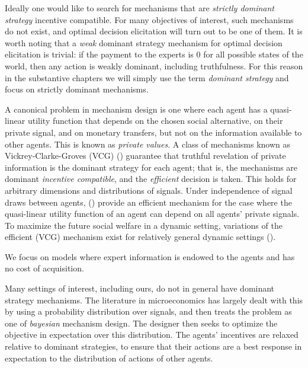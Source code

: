 Ideally one would like to search for mechanisms that are \emph{strictly dominant strategy} incentive compatible. %
For many objectives of interest, such mechanisms do not exist, and optimal decision elicitation will turn out to be one of them.
It is worth noting that a \emph{weak} dominant strategy mechanism for optimal decision elicitation is trivial: if the payment to the experts is 0 for all possible states of the world, then any action is weakly dominant, including truthfulness. 
For this reason in the substantive chapters we will simply use the term \emph{dominant strategy} and focus on strictly dominant mechanisms. 

A canonical problem in mechanism design is one where each agent has a quasi-linear utility function that depends on the chosen social alternative, on their private signal, and on monetary transfers, but not on the information available to other agents.
This is known as \emph{private values}.
A class of mechanisms known as Vickrey-Clarke-Groves (VCG)  (\cite{vickrey1961,clarke1971,groves1973}) guarantee that truthful revelation of private information is the dominant strategy for each agent; that is, the mechanisms are dominant \emph{incentive compatible}, and the \emph{efficient} decision is taken. 
This holds for arbitrary dimensions and distributions of signals.
Under independence of signal draws between agents, (\cite{jehiel2001efficient}) provide an efficient mechanism for the case where the quasi-linear utility function of an agent can depend on all agents' private signals. 
To maximize the future social welfare in a dynamic setting, variations of the efficient (VCG) mechanism exist for relatively general dynamic settings (\cite{bergemann2010dynamic,parkes2003van,athey2007designing}).

We focus on models where expert information is endowed to the agents and has no cost of acquisition.

Many settings of interest, including ours, do not in general have dominant strategy mechanisms. 
The literature in microeconomics has largely dealt with this by using a probability distribution over signals, and then treats the problem as one of \emph{bayesian} mechanism design.
The designer then seeks to optimize the objective in expectation over this distribution. The agents' incentives are relaxed relative to dominant strategies, to ensure that their actions are a best response in expectation to the distribution of actions of other agents.

